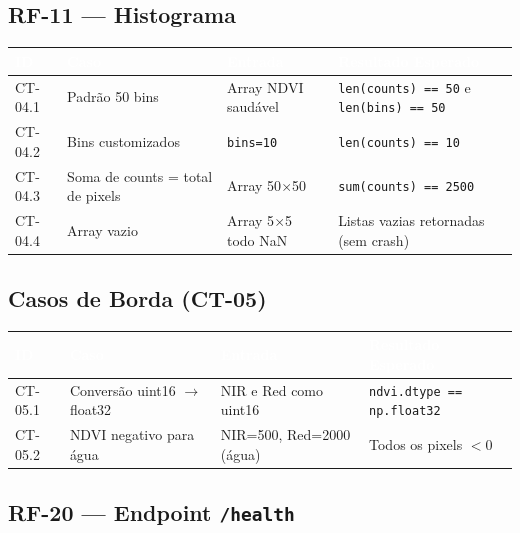 \documentclass[11pt, a4paper]{article}
\begin{document}
\subsection{RF-11 --- Histograma}

\begin{table}[H]
\centering
\footnotesize
{}
\begin{tabularx}{\textwidth}{@{}p{1.5cm}p{4cm}p{3.5cm}X@{}}
\toprule
\rowcolor{tabheader}\textcolor{white}{\textbf{ID}} & \textcolor{white}{\textbf{Caso}} & \textcolor{white}{\textbf{Entrada}} & \textcolor{white}{\textbf{Resultado Esperado}}\\
\midrule
CT-04.1 & Padrão 50 bins & Array NDVI saudável & \texttt{len(counts) == 50} e \texttt{len(bins) == 50}\\
CT-04.2 & Bins customizados & \texttt{bins=10} & \texttt{len(counts) == 10}\\
CT-04.3 & Soma de counts = total de pixels & Array 50$\times$50 & \texttt{sum(counts) == 2500}\\
CT-04.4 & Array vazio & Array 5$\times$5 todo NaN & Listas vazias retornadas (sem crash)\\
\bottomrule
\end{tabularx}
\end{table}

\subsection{Casos de Borda (CT-05)}

\begin{table}[H]
\centering
\footnotesize
{}
\begin{tabularx}{\textwidth}{@{}p{1.5cm}p{4cm}p{3.5cm}X@{}}
\toprule
\rowcolor{tabheader}\textcolor{white}{\textbf{ID}} & \textcolor{white}{\textbf{Caso}} & \textcolor{white}{\textbf{Entrada}} & \textcolor{white}{\textbf{Resultado Esperado}}\\
\midrule
CT-05.1 & Conversão uint16 $\rightarrow$ float32 & NIR e Red como uint16 & \texttt{ndvi.dtype == np.float32}\\
CT-05.2 & NDVI negativo para água & NIR=500, Red=2000 (água) & Todos os pixels $< 0$\\
\bottomrule
\end{tabularx}
\end{table}

\subsection{RF-20 --- Endpoint \texttt{/health}}
\end{document}

